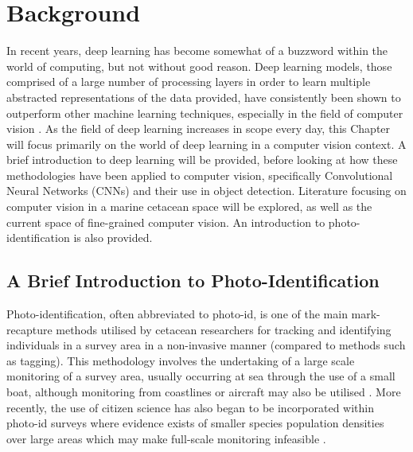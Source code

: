 \chapter{Background}\label{ch:Background}

In recent years, deep learning has become somewhat of a buzzword within the world of computing, but not without good reason. Deep learning models, those comprised of a large number of processing layers in order to learn multiple abstracted representations of the data provided, have consistently been shown to outperform other machine learning techniques, especially in the field of computer vision \cite{lecun_deep_2015}. As the field of deep learning increases in scope every day, this Chapter will focus primarily on the world of deep learning in a computer vision context. A brief introduction to deep learning will be provided, before looking at how these methodologies have been applied to computer vision, specifically Convolutional Neural Networks (CNNs) and their use in object detection. Literature focusing on computer vision in a marine cetacean space will be explored, as well as the current space of fine-grained computer vision. An introduction to photo-identification is also provided. 

\section{A Brief Introduction to Photo-Identification}\label{ch:Background,sec:photo-id}

Photo-identification, often abbreviated to photo-id, is one of the main mark-recapture methods utilised by cetacean researchers for tracking and identifying individuals in a survey area in a non-invasive manner (compared to methods such as tagging). This methodology involves the undertaking of a large scale monitoring of a survey area, usually occurring at sea through the use of a small boat, although monitoring from coastlines or aircraft may also be utilised \cite{payne_long_1986, forney_seasonal_1998, wursig_methods_1990}. More recently, the use of citizen science has also began to be incorporated within photo-id surveys where evidence exists of smaller species population densities over large areas which may make full-scale monitoring infeasible \cite{gibson_using_2020, cheney_integrating_2013}.

